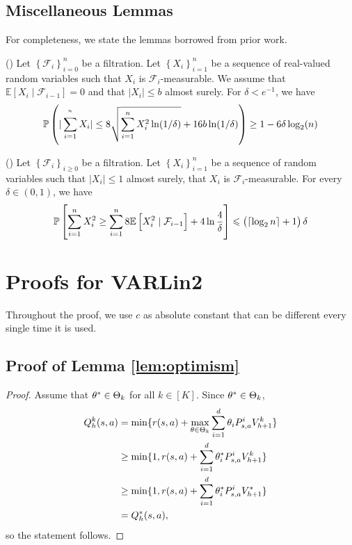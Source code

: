 \subsection{Miscellaneous Lemmas}

For completeness, we state the lemmas borrowed from prior work.
\begin{lemma}\label{lem:du-thm4}(\citet[Lemma 9]{zhang21variance})
  Let $\left\{\mathcal{F}_{i}\right\}_{i=0}^{n}$ be a filtration. Let $\left\{X_{i}\right\}_{i=1}^{n}$ be a sequence of real-valued random variables such that $X_{i}$ is $\mathcal{F}_{i}$-measurable. We assume that $\mathbb{E}\left[X_{i} \mid \mathcal{F}_{i-1}\right]=0$ and that $\left|X_{i}\right| \le b$ almost surely. For $\delta<e^{-1}$, we have
  \begin{align*}
    \PP\del{|\sum_{i=1}^{^n} X_i| \le 8 \sqrt{\sum_{i=1}^{n}X_i^2 \ln(1/\dt)} + 16 b \ln(1/\dt) }  \ge 1 - 6\dt \log_2(n)
  \end{align*}
\end{lemma}

\begin{lemma}
  \label{lem:du-lem10}(\citet[Lemma 10]{zhang21variance})
  Let $\left\{\mathcal{F}_{i}\right\}_{i \ge 0}$ be a filtration. Let $\left\{X_{i}\right\}_{i=1}^{n}$ be a sequence of random variables such that $\left|X_{i}\right| \leq 1$ almost surely, that $X_{i}$ is $\mathcal{F}_{i}$-measurable. For every $\delta \in(0,1)$, we have
  $$
  \operatorname{\mathbb{P}}\left[\sum_{i=1}^{n} X_{i}^{2} \ge \sum_{i=1}^{n} 8 \mathbb{E}\left[X_{i}^{2} \mid \mathcal{F}_{i-1}\right]+4 \ln \frac{4}{\delta}\right] \leqslant\left(\left\lceil\log _{2} n\right\rceil+1\right) \delta
  $$
\end{lemma}




\section{Proofs for VARLin2}

Throughout the proof, we use $c$ as absolute constant that can be different every single time it is used.



\subsection{Proof of Lemma \ref{lem:optimism}}
\begin{proof}
Assume that ${\theta}^* \in \Theta_k$ for all $k\in[K]$. Since ${\theta}^* \in \Theta_k$,
\begin{align*}
    Q_h^k(s,a)&=\min\{r(s,a)+\max_{{\theta} \in \Theta_k} \sum_{i=1}^d{\theta}_iP_{s,a}^i V_{h+1}^k\}
    \\&\ge \min \{1,r(s,a)+\sum_{i=1}^d\theta_i^*P_{s,a}^iV_{h+1}^k\}
    \\&\ge \min \{1,r(s,a)+\sum_{i=1}^d\theta_i^*P_{s,a}^iV_{h+1}^*\}
    \\&=Q_h^*(s,a),
\end{align*}
so the statement follows.
\end{proof}

